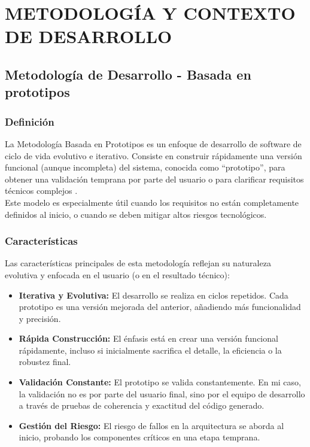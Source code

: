 \chapter{METODOLOGÍA Y CONTEXTO DE DESARROLLO}
\label{chap:area-aplicacion}

\section{Metodología de Desarrollo - Basada en prototipos}
\label{sec: metodologia}

\subsection{Definición}
\label{subsec:prototipos-definicion}

La Metodología Basada en Prototipos es un enfoque de desarrollo de software de ciclo de vida evolutivo e iterativo. Consiste en construir rápidamente una versión funcional (aunque incompleta) del sistema, conocida como ``prototipo'', para obtener una validación temprana por parte del usuario o para clarificar requisitos técnicos complejos \cite{pressman2020ingenieria}.\\
Este modelo es especialmente útil cuando los requisitos no están completamente definidos al inicio, o cuando se deben mitigar altos riesgos tecnológicos.

\subsection{Características}
\label{subsec: prototipos-caracteristicas}

Las características principales de esta metodología reflejan su naturaleza evolutiva y enfocada en el usuario (o en el resultado técnico):

\begin{itemize}
    \item \textbf{Iterativa y Evolutiva:} El desarrollo se realiza en ciclos repetidos. Cada prototipo es una versión mejorada del anterior, añadiendo más funcionalidad y precisión.
    \item \textbf{Rápida Construcción:} El énfasis está en crear una versión funcional rápidamente, incluso si inicialmente sacrifica el detalle, la eficiencia o la robustez final.
    \item \textbf{Validación Constante:} El prototipo se valida constantemente. En mi caso, la validación no es por parte del usuario final, sino por el equipo de desarrollo a través de pruebas de coherencia y exactitud del código generado.
    \item \textbf{Gestión del Riesgo:} El riesgo de fallos en la arquitectura se aborda al inicio, probando los componentes críticos en una etapa temprana.
\end{itemize}


